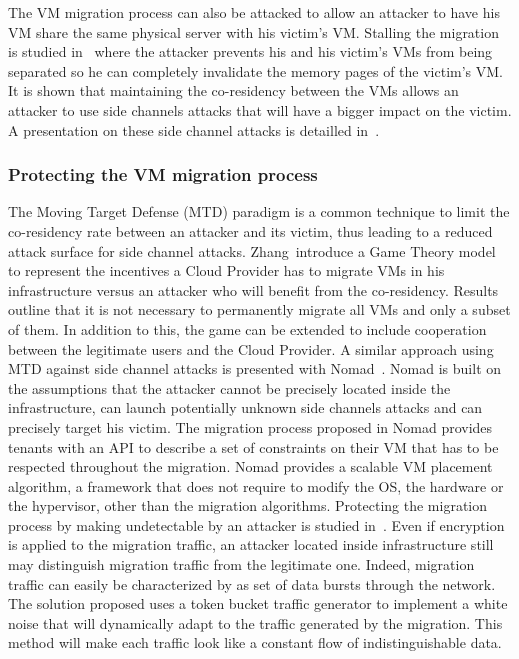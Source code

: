The VM migration process can also be attacked to allow an attacker to have his VM share the same physical server with his victim's VM. Stalling the migration is studied in~\cite{stalling-atya2017} where the attacker prevents his and his victim's VMs from being separated so he can completely invalidate the memory pages of the victim's VM. It is shown that maintaining the co-residency between the VMs allows an attacker to use side channels attacks that will have a bigger impact on the victim.
A presentation on these side channel attacks is detailled in~\cite{malicious-atya2017}.

\subsubsection{Protecting the VM migration process}
The Moving Target Defense (MTD) paradigm is a common technique to limit the co-residency rate between an attacker and its victim, thus leading to a reduced attack surface for side channel attacks.
Zhang~\etal introduce a Game Theory model~\cite{incentivemtd-Zhang2012} to represent the incentives a Cloud Provider has to migrate VMs in his infrastructure versus an attacker who will benefit from the co-residency. Results outline that it is not necessary to permanently migrate all VMs and only a subset of them. In addition to this, the game can be extended to include cooperation between the legitimate users and the Cloud Provider.
A similar approach using MTD against side channel attacks is presented with Nomad~\cite{nomad-Moon2015b}. Nomad is built on the assumptions that the attacker cannot be precisely located inside the infrastructure, can launch potentially unknown side channels attacks and can precisely target his victim. 
The migration process proposed in Nomad provides tenants with an API to describe a set of constraints on their VM that has to be respected throughout the migration.
Nomad provides a scalable VM placement algorithm, a framework that does not require to modify the OS, the hardware or the hypervisor, other than the migration algorithms.
Protecting the migration process by making undetectable by an attacker is studied in~\cite{stealth-Achleitner2017a}. Even if encryption is applied to the migration traffic, an attacker located inside infrastructure still may distinguish migration traffic from the legitimate one. Indeed, migration traffic can easily be characterized by as set of data bursts through the network. The solution proposed uses a token bucket traffic generator to implement a white noise that will dynamically adapt to the traffic generated by the migration. This method will make each traffic look like a constant flow of indistinguishable data.

